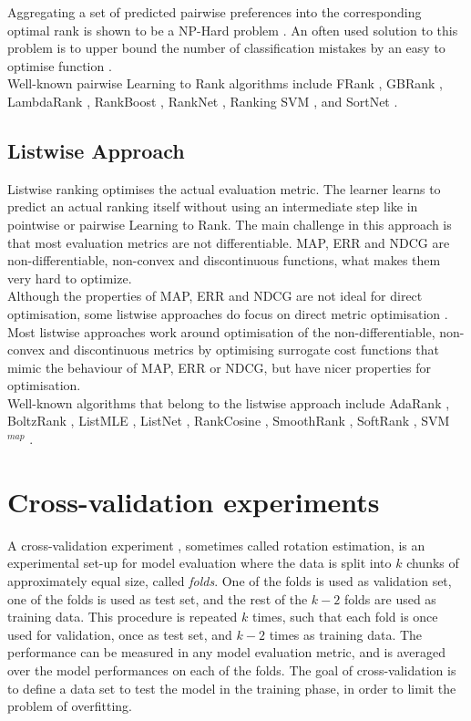 Aggregating a set of predicted pairwise preferences into the corresponding optimal rank is shown to be a NP-Hard problem \cite{Feldman2012}. An often used solution to this problem is to upper bound the number of classification mistakes by an easy to optimise function \cite{Bartlett2006}.\\

Well-known pairwise Learning to Rank algorithms include FRank \cite{Tsai2007}, GBRank \cite{Zheng2007}, LambdaRank \cite{Burges2006}, RankBoost \cite{Freund2003}, RankNet \cite{Burges2005}, Ranking \acs{SVM} \cite{Herbrich1999b,Joachims2002}, and SortNet \cite{Rigutini2008}.
\subsection{Listwise Approach}
Listwise ranking optimises the actual evaluation metric. The learner learns to predict an actual ranking itself without using an intermediate step like in pointwise or pairwise Learning to Rank. The main challenge in this approach is that most evaluation metrics are not differentiable. \ac{MAP}, \ac{ERR} and \ac{NDCG} are non-differentiable, non-convex and discontinuous functions, what makes them very hard to optimize.\\

Although the properties of \ac{MAP}, \ac{ERR} and \ac{NDCG} are not ideal for direct optimisation, some listwise approaches do focus on direct metric optimisation \cite{Yue2007, Taylor2008, Chapelle2010}. Most listwise approaches work around optimisation of the non-differentiable, non-convex and discontinuous metrics by optimising surrogate cost functions that mimic the behaviour of \ac{MAP}, \ac{ERR} or \ac{NDCG}, but have nicer properties for optimisation.\\

Well-known algorithms that belong to the listwise approach include AdaRank \cite{Xu2007}, BoltzRank \cite{Volkovs2009}, ListMLE \cite{Xia2008}, ListNet \cite{Cao2007}, RankCosine \cite{Qin2008}, SmoothRank \cite{Chapelle2010}, SoftRank \cite{Taylor2008}, \acs{SVM}$^{map}$ \cite{Yue2007}.

\section{Cross-validation experiments}
\label{sec:cross_validation}
A cross-validation experiment \cite{kohavi1995}, sometimes called rotation estimation, is an experimental set-up for model evaluation where the data is split into $k$ chunks of approximately equal size, called \emph{folds}. One of the folds is used as validation set, one of the folds is used as test set, and the rest of the $k - 2$ folds are used as training data. This procedure is repeated $k$ times, such that each fold is once used for validation, once as test set, and $k - 2$ times as training data. The performance can be measured in any model evaluation metric, and is averaged over the model performances on each of the folds. The goal of cross-validation is to define a data set to test the model in the training phase, in order to limit the problem of overfitting.\\

